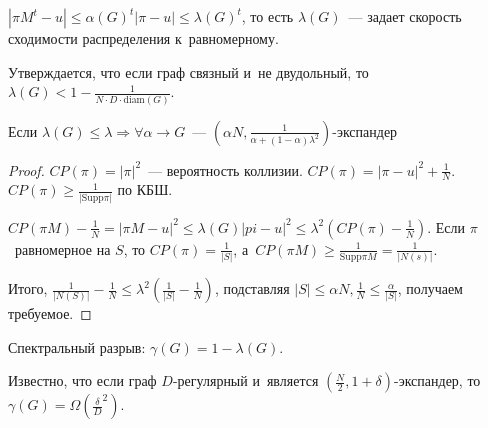 \documentclass{article}
\begin{document}
$|\pi M^t - u| \le \alpha(G)^t |\pi - u| \le \lambda(G)^t$, то есть
$\lambda(G)$~--- задает скорость сходимости распределения к~равномерному.

Утверждается, что если граф связный и~не двудольный, то $\lambda(G) <
1 - \frac{1}{N \cdot D \cdot \text{diam}(G)}$.

\begin{theorem}
	Если $\lambda(G) \le \lambda \Rightarrow \forall \alpha \rightarrow G$~---
	$(\alpha N, \frac{1}{\alpha + (1 - \alpha) \lambda^2})$-экспандер
\end{theorem}
\begin{proof}
	$CP(\pi) = |\pi|^2$~--- вероятность коллизии. $CP(\pi) = |\pi - u|^2 +
	\frac{1}{N}$. $CP(\pi) \ge \frac{1}{|\text{Supp} \pi|}$ по КБШ.

	$CP(\pi M) - \frac{1}{N} = |\pi M - u|^2 \le \lambda(G) |pi - u|^2 \le
	\lambda^2 (CP(\pi) - \frac{1}{N})$. Если $\pi$~равномерное на $S$, то $CP(\pi)
	= \frac{1}{|S|}$, а~$CP(\pi M) \ge \frac{1}{\text{Supp} \pi M} =
	\frac{1}{|N(s)|}$.

	Итого, $\frac{1}{|N(S)|} - \frac{1}{N} \le \lambda^2 (\frac{1}{|S|} -
	\frac{1}{N})$, подставляя $|S| \le \alpha N, \frac{1}{N} \le
	\frac{\alpha}{|S|}$, получаем требуемое.
\end{proof}

Спектральный разрыв: $\gamma(G) = 1 - \lambda(G)$.

Известно, что если граф $D$-регулярный и~является $\left(\frac{N}{2}, 1 +
\delta\right)$-экспандер, то $\gamma(G) =
\Omega\left(\frac{\delta}{D}^2\right)$.
\end{document}
